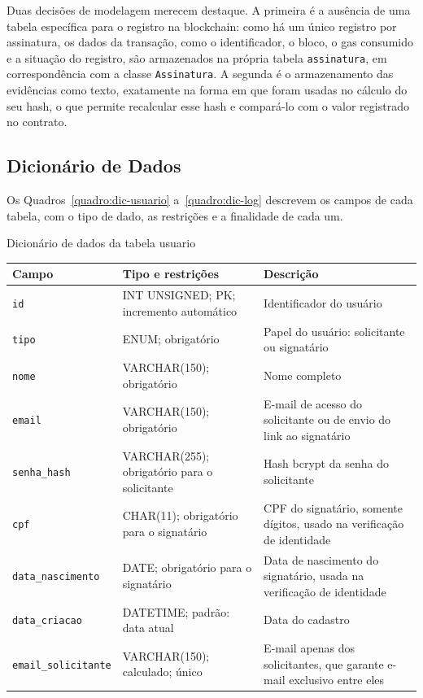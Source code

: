 \documentclass[
    12pt,
    a4paper,
    oneside,
    chapter=TITLE,
    section=TITLE,
    subsection=TITLE,
    subsubsection=TITLE,
    sumario=tradicional,
    english,
    brazil
]{abntex2}
\newcommand{\elem}[1]{\texttt{#1}}
\begin{document}
Duas decisões de modelagem merecem destaque. A primeira é a ausência de uma tabela específica para o registro na blockchain: como há um único registro por assinatura, os dados da transação, como o identificador, o bloco, o gas consumido e a situação do registro, são armazenados na própria tabela \elem{assinatura}, em correspondência com a classe \elem{Assinatura}. A segunda é o armazenamento das evidências como texto, exatamente na forma em que foram usadas no cálculo do seu hash, o que permite recalcular esse hash e compará-lo com o valor registrado no contrato.

\subsection{Dicionário de Dados}

Os Quadros~\ref{quadro:dic-usuario} a~\ref{quadro:dic-log} descrevem os campos de cada tabela, com o tipo de dado, as restrições e a finalidade de cada um.

\begingroup
\setlength{\intextsep}{6pt plus 2pt minus 2pt}
\begin{quadro}[H]
    \caption{Dicionário de dados da tabela usuario}
    \label{quadro:dic-usuario}
    \centering
    \footnotesize
    \begin{tabular}{L{4.5cm}L{3.6cm}L{6.3cm}}
        \toprule
        \textbf{Campo} & \textbf{Tipo e restrições} & \textbf{Descrição} \\
        \midrule
        \elem{id} & INT UNSIGNED; PK; incremento automático & Identificador do usuário \\
        \elem{tipo} & ENUM; obrigatório & Papel do usuário: solicitante ou signatário \\
        \elem{nome} & VARCHAR(150); obrigatório & Nome completo \\
        \elem{email} & VARCHAR(150); obrigatório & E-mail de acesso do solicitante ou de envio do link ao signatário \\
        \elem{senha\_hash} & VARCHAR(255); obrigatório para o solicitante & Hash bcrypt da senha do solicitante \\
        \elem{cpf} & CHAR(11); obrigatório para o signatário & CPF do signatário, somente dígitos, usado na verificação de identidade \\
        \elem{data\_nascimento} & DATE; obrigatório para o signatário & Data de nascimento do signatário, usada na verificação de identidade \\
        \elem{data\_criacao} & DATETIME; padrão: data atual & Data do cadastro \\
        \elem{email\_solicitante} & VARCHAR(150); calculado; único & E-mail apenas dos solicitantes, que garante e-mail exclusivo entre eles \\
        \bottomrule
    \end{tabular}
\end{quadro}
\end{document}
